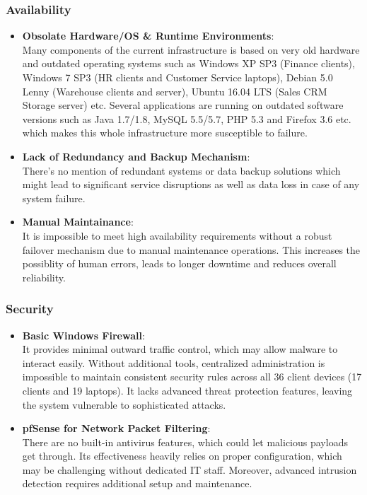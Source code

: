 \documentclass{llncs}
\begin{document}
\subsubsection*{Availability}
\begin{itemize}
  \item \textbf{Obsolate Hardware/OS \& Runtime Environments}:
        \\
        Many components of the current infrastructure is based on very old hardware and outdated operating systems such as 
        Windows XP SP3 (Finance clients), Windows 7 SP3 (HR clients and Customer Service laptops), Debian 5.0 Lenny (Warehouse clients and server),
        Ubuntu 16.04 LTS (Sales CRM Storage server) etc. Several applications are running on outdated software versions such as Java 1.7/1.8, 
        MySQL 5.5/5.7, PHP 5.3 and Firefox 3.6 etc. which makes this whole infrastructure more susceptible to failure.
        \\
  \item \textbf{Lack of Redundancy and Backup Mechanism}:
        \\ 
        There's no mention of redundant systems or data backup solutions which might lead to significant service disruptions as well as data loss in case of any system failure.
        \\
  \item \textbf{Manual Maintainance}:
        \\It is impossible to meet high availability requirements without a robust failover mechanism due to manual maintenance operations. 
        This increases the possiblity of human errors, leads to longer downtime and reduces overall reliability.
        \\
\end{itemize}

\subsubsection*{Security}
\begin{itemize}
  \item \textbf{Basic Windows Firewall}:
        \\
        It provides minimal outward traffic control, which may allow malware to interact easily. 
        Without additional tools, centralized administration is impossible to maintain consistent security rules across all 36 client devices (17 clients and 19 laptops).
        It lacks advanced threat protection features, leaving the system vulnerable to sophisticated attacks.
        \\
  \item \textbf{pfSense for Network Packet Filtering}:
        \\ 
        There are no built-in antivirus features, which could let malicious payloads get through. Its effectiveness heavily relies on proper configuration, which may be challenging without dedicated IT staff.
        Moreover, advanced intrusion detection requires additional setup and maintenance.
        \\
 
\end{itemize}
\end{document}
